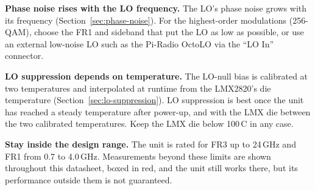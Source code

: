 \textbf{Phase noise rises with the LO frequency.} The LO's phase noise grows with its frequency
(Section~\ref{sec:phase-noise}). For the highest-order modulations (256-QAM), choose the FR1 and sideband that put
the LO as low as possible, or use an external low-noise LO such as the Pi-Radio OctoLO via the ``LO In'' connector.

\textbf{LO suppression depends on temperature.} The LO-null bias is calibrated at two temperatures and interpolated at
runtime from the LMX2820's die temperature (Section~\ref{sec:lo-suppression}). LO suppression is best once the unit
has reached a steady temperature after power-up, and with the LMX die between the two calibrated temperatures. Keep
the LMX die below 100\,\textdegree C in any case.

\textbf{Stay inside the design range.} The unit is rated for FR3 up to 24\,GHz and FR1 from 0.7 to 4.0\,GHz.
Measurements beyond these limits are shown throughout this datasheet, boxed in red, and the unit still works there,
but its performance outside them is not guaranteed.
